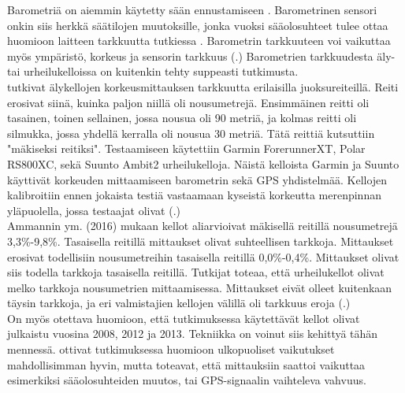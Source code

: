 \documentclass[utf8,bachelor,finnish]{bachelor}
\begin{document}
        Barometriä on aiemmin käytetty sään ennustamiseen \parencite{manivannan_challenges_2020}.
         Barometrinen sensori onkin siis herkkä säätilojen muutoksille, jonka vuoksi sääolosuhteet tulee ottaa huomioon laitteen tarkkuutta tutkiessa \parencite{manivannan_challenges_2020, ammann_accuracy_2016}.
          Barometrin tarkkuuteen voi vaikuttaa myös ympäristö, korkeus ja sensorin tarkkuus (\cite{manivannan_challenges_2020}.)
           Barometrien tarkkuudesta äly- tai urheilukelloissa on kuitenkin tehty suppeasti tutkimusta.\\
           
    \textcite{ammann_accuracy_2016} tutkivat älykellojen korkeusmittauksen tarkkuutta erilaisilla juoksureiteillä. Reiti erosivat siinä, kuinka paljon niillä oli nousumetrejä.
     Ensimmäinen reitti oli tasainen, toinen sellainen, jossa nousua oli 90 metriä, ja kolmas reitti oli silmukka, jossa yhdellä kerralla oli nousua 30 metriä.
      Tätä reittiä kutsuttiin "mäkiseksi reitiksi".
       Testaamiseen käytettiin Garmin ForerunnerXT, Polar RS800XC, sekä Suunto Ambit2 urheilukelloja. Näistä kelloista Garmin ja
        Suunto käyttivät korkeuden mittaamiseen barometrin sekä GPS yhdistelmää.
         Kellojen kalibroitiin ennen jokaista testiä vastaamaan kyseistä korkeutta merenpinnan yläpuolella, jossa testaajat olivat (\cite{ammann_accuracy_2016}.)\\

    Ammannin ym. (2016) mukaan kellot aliarvioivat mäkisellä reitillä nousumetrejä 3,3\%-9,8\%. Tasaisella reitillä mittaukset olivat suhteellisen tarkkoja.
     Mittaukset erosivat todellisiin nousumetreihin tasaisella reitillä 0,0\%-0,4\%. Mittaukset olivat siis todella tarkkoja tasaisella reitillä.
      Tutkijat toteaa, että urheilukellot olivat melko tarkkoja nousumetrien mittaamisessa. Mittaukset eivät olleet kuitenkaan
       täysin tarkkoja, ja eri valmistajien kellojen välillä oli tarkkuus eroja (\cite{ammann_accuracy_2016}.)\\
       
    On myös otettava huomioon, että tutkimuksessa käytettävät kellot olivat julkaistu vuosina 2008, 2012 ja 2013. Tekniikka on voinut siis kehittyä tähän mennessä. 
     \textcite{ammann_accuracy_2016} ottivat tutkimuksessa huomioon ulkopuoliset vaikutukset mahdollisimman hyvin, mutta toteavat, että mittauksiin
      saattoi vaikuttaa esimerkiksi sääolosuhteiden muutos, tai GPS-signaalin vaihteleva vahvuus.\\
\end{document}
